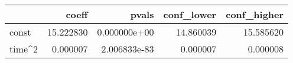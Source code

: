 \begin{tabular}{lrrrr}
\toprule
{} &      coeff &         pvals &  conf\_lower &  conf\_higher \\
\midrule
const  &  15.222830 &  0.000000e+00 &   14.860039 &    15.585620 \\
time\textasciicircum 2 &   0.000007 &  2.006833e-83 &    0.000007 &     0.000008 \\
\bottomrule
\end{tabular}
